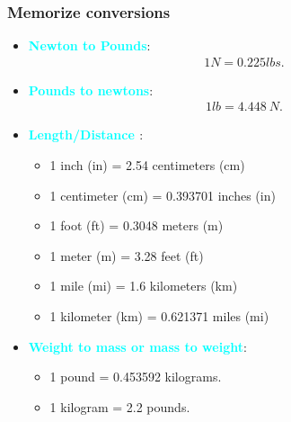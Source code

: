 \documentclass{report}
\begin{document}
    \pagebreak 
    \subsubsection{Memorize conversions}
    \begin{itemize}
        \item \textbf{\textcolor{cyan}{Newton to Pounds}}: 
            \begin{align*}
                1N = 0.225lbs
            .\end{align*}
        \item \textbf{\textcolor{cyan}{Pounds to newtons}}:
            \begin{align*}
                1lb = 4.448\ N
            .\end{align*}
        \item \textbf{\textcolor{cyan}{Length/Distance }}:
            \begin{itemize}
                \item 1 inch (in) = 2.54 centimeters (cm)
                \item 1 centimeter (cm) = 0.393701 inches (in)
                \item 1 foot (ft) = 0.3048 meters (m)
                \item 1 meter (m) = 3.28 feet (ft)
                \item 1 mile (mi) = 1.6 kilometers (km)
                \item 1 kilometer (km) = 0.621371 miles (mi)
            \end{itemize}
    \item \textbf{\textcolor{cyan}{Weight to mass or mass to weight}}:
        \begin{itemize}
            \item 1 pound = 0.453592 kilograms.
            \item 1 kilogram = 2.2 pounds.
        \end{itemize}
    \end{itemize}



    \pagebreak 
\end{document}
